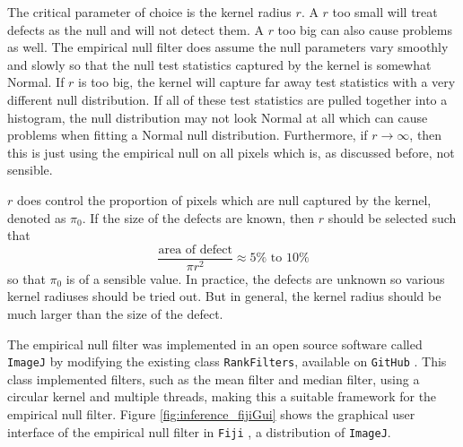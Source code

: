 The critical parameter of choice is the kernel radius $r$. A $r$ too small will treat defects as the null and will not detect them. A $r$ too big can also cause problems as well. The empirical null filter does assume the null parameters vary smoothly and slowly so that the null test statistics captured by the kernel is somewhat Normal. If $r$ is too big, the kernel will capture far away test statistics with a very different null distribution. If all of these test statistics are pulled together into a histogram, the null distribution may not look Normal at all which can cause problems when fitting a Normal null distribution. Furthermore, if $r\rightarrow \infty$, then this is just using the empirical null on all pixels which is, as discussed before, not sensible.

$r$ does control the proportion of pixels which are null captured by the kernel, denoted as $\pi_0$. If the size of the defects are known, then $r$ should be selected such that
\begin{equation}
\dfrac{
	\text{area of defect}
}
{
	\pi r^2
}
\approx
5\% \text{ to } 10 \%
\end{equation}
so that $\pi_0$ is of a sensible value. In practice, the defects are unknown so various kernel radiuses should be tried out. But in general, the kernel radius should be much larger than the size of the defect.

The empirical null filter was implemented in an open source software called \texttt{ImageJ} \citep{abramoff2004image, schneider2012nih, perez2013image} by modifying the existing class \texttt{RankFilters}, available on \texttt{GitHub} \citep{imagej2018rank}. This class implemented filters, such as the mean filter and median filter, using a circular kernel and multiple threads, making this a suitable framework for the empirical null filter. Figure \ref{fig:inference_fijiGui} shows the graphical user interface of the empirical null filter in \texttt{Fiji} \citep{schindelin2012fiji}, a distribution of \texttt{ImageJ}.


